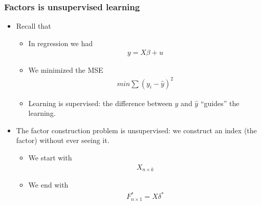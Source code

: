 \documentclass[
  shownotes,
  xcolor={svgnames},
  hyperref={colorlinks,citecolor=DarkBlue,linkcolor=DarkRed,urlcolor=DarkBlue}
  , aspectratio=169]{beamer}
\begin{document}
\begin{frame}
\frametitle{Factors is unsupervised learning}

\begin{itemize}

\item Recall that 
\begin{itemize}
  \item In regression we had
  \begin{align}
  y =X \beta +u
  \end{align}
 \item We minimized the MSE
 \begin{align}
 min \sum (y_i-\hat{y})^2
 \end{align}

\item Learning is supervised: the difference between $y$ and $\hat y$ ``guides'' the learning.
\end{itemize}
\item  The factor construction problem is unsupervised: we construct an index (the factor) without ever seeing it.
\begin{itemize}
\item We start with 
\begin{align}
X_{n\times k}
\end{align}
\item We end  with 
\begin{align}
F^*_{n\times 1} = X\delta^*
\end{align}
\end{itemize}
\end{itemize}
\end{frame}
\end{document}

